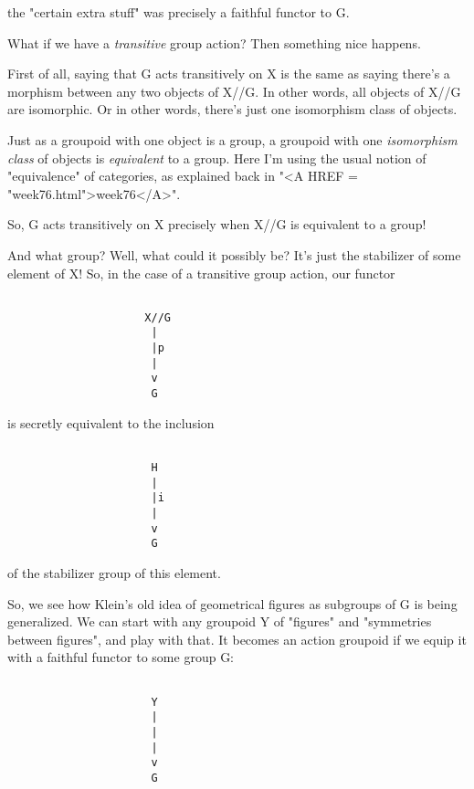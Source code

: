the "certain extra stuff" was precisely a faithful functor to G.  

What if we have a \emph{transitive} group action?  Then something nice
happens.

First of all, saying that G acts transitively on X is the same as
saying there's a morphism between any two objects of X//G.   In 
other words, all objects of X//G are isomorphic.  Or in other words, 
there's just one isomorphism class of objects.  

Just as a groupoid with one object is a group, a groupoid with one 
\emph{isomorphism class} of objects is \emph{equivalent} to a group.  Here 
I'm using the usual notion of "equivalence" of categories, as 
explained back in "<A HREF = "week76.html">week76</A>".

So, G acts transitively on X precisely when X//G is equivalent 
to a group!

And what group?  Well, what could it possibly be?  It's just the 
stabilizer of some element of X!  So, in the case of a transitive 
group action, our functor


\begin{verbatim}

                     X//G 
                      |
                      |p
                      |
                      v
                      G
\end{verbatim}
    
is secretly equivalent to the inclusion


\begin{verbatim}

                      H
                      |
                      |i
                      |
                      v
                      G
\end{verbatim}
    
of the stabilizer group of this element.

So, we see how Klein's old idea of geometrical figures as
subgroups of G is being generalized.  We can start with any groupoid Y
of "figures" and "symmetries between figures", and
play with that.  It becomes an action groupoid if we equip it with a
faithful functor to some group G:


\begin{verbatim}

                      Y
                      |
                      |
                      |
                      v
                      G
\end{verbatim}
    
